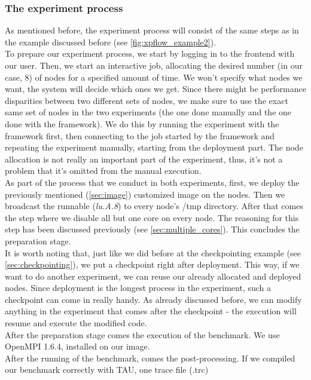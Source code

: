 \subsubsection{The experiment process}
\label{sec:experiment_process}
As mentioned before, the experiment process will consist of the same
steps as in the example discussed before
(see \ref{fig:xpflow_example2}).\\[0.3cm]
To prepare our experiment process, we start by
logging in to the frontend with our user. Then, we start an
interactive job, allocating the desired number (in our case, 8) of
nodes for a specified amount of time. We won't specify what nodes we
want, the system will decide which ones we get. Since there might be
performance disparities between two different sets of nodes, we make
sure to use the exact same set of nodes in the two experiments (the
one done manually and the one done with the framework). We do this by
running the experiment with the framework first, then connecting to
the job started by the framework and repeating the experiment
manually, starting from the deployment part. The node allocation is
not really an important part of the experiment, thus, it's not a
problem that it's omitted from the manual execution.\\[0.3cm]
As part of the process that we conduct in both experiments, first, we
deploy the previously mentioned (\ref{sec:image}) customized image on the
nodes. Then we broadcast the runnable (\emph{lu.A.8}) to every node's
/tmp directory. After that comes the step where we disable all but one
core on every node. The reasoning for this step has been discussed
previously (see \ref{sec:multiple_cores}). This concludes the
preparation stage.\\[0.3cm]
It is worth noting that, just like we did before at the
checkpointing example (see \ref{sec:checkpointing}), we put a
checkpoint right after deployment. This way, if we want to do another
experiment, we can reuse our already allocated and deployed
nodes. Since deployment is the longest process in the experiment, such
a checkpoint can come in really handy. As already discussed before, we
can modify anything in the experiment that comes after the checkpoint
- the execution will resume and execute the modified code.\\[0.3cm]
After the preparation stage comes the execution of the benchmark. We
use OpenMPI 1.6.4, installed on our image.\\[0.3cm]
After the running of the benchmark, comes the post-processing. If we
compiled our benchmark correctly with TAU, one trace file (.trc)

